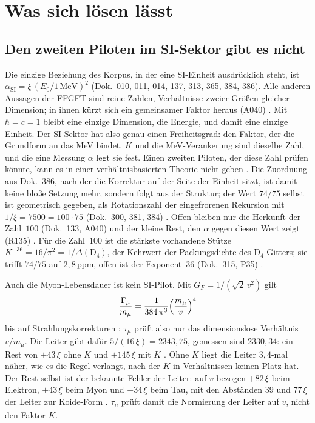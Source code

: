 \section{Was sich lösen lässt}

\subsection{Den zweiten Piloten im SI-Sektor gibt es nicht}

Die einzige Beziehung des Korpus, in der eine SI-Einheit ausdrücklich steht, ist
$\alpha_{\text{SI}}=\xi\,(E_0/1\,\text{MeV})^2$ (Dok.~010, 011, 014, 137, 313, 365, 384, 386). Alle anderen
Aussagen der FFGFT sind reine Zahlen, Verhältnisse zweier Größen gleicher Dimension; in ihnen kürzt sich
ein gemeinsamer Faktor heraus (A040) \BM. Mit $\hbar=c=1$ bleibt eine einzige Dimension, die Energie, und
damit eine einzige Einheit. Der SI-Sektor hat also genau einen Freiheitsgrad: den Faktor, der die Grundform
an das MeV bindet. $K$ und die MeV-Verankerung sind dieselbe Zahl, und die eine Messung $\alpha$ legt sie
fest. Einen zweiten Piloten, der diese Zahl prüfen könnte, kann es in einer verhältnisbasierten Theorie
nicht geben \BM. Die Zuordnung aus Dok.~386, nach der die Korrektur auf der Seite der Einheit sitzt, ist
damit keine bloße Setzung mehr, sondern folgt aus der Struktur; der Wert $74/75$ selbst ist
geometrisch gegeben, als Rotationszahl der eingefrorenen Rekursion mit $1/\xi=7500=100\cdot75$
(Dok.~300, 381, 384) \BM. Offen bleiben nur die Herkunft der Zahl~$100$ (Dok.~133, A040) und der
kleine Rest, den $\alpha$ gegen diesen Wert zeigt (R135) \SM. Für die Zahl~$100$ ist die stärkste
vorhandene Stütze $K^{-36}=16/\pi^2=1/\Delta(\mathrm{D}_4)$, der Kehrwert der Packungsdichte des
$\mathrm{D}_4$-Gitters; sie trifft $74/75$ auf $2{,}8$\,ppm, offen ist der Exponent~$36$ (Dok.~315, P35)
\KM.

Auch die Myon-Lebensdauer ist kein SI-Pilot. Mit $G_F=1/(\sqrt2\,v^2)$ gilt
\begin{equation}
  \frac{\Gamma_\mu}{m_\mu}=\frac{1}{384\,\pi^3}\Bigl(\frac{m_\mu}{v}\Bigr)^4
\end{equation}
bis auf Strahlungskorrekturen \QM; $\tau_\mu$ prüft also nur das dimensionslose Verhältnis $v/m_\mu$. Die
Leiter gibt dafür $5/(16\,\xi)=2343{,}75$, gemessen sind $2330{,}34$: ein Rest von $+43\,\xi$ ohne $K$
und $+145\,\xi$ mit $K$ \KM. Ohne $K$ liegt die Leiter $3{,}4$-mal näher, wie es die Regel verlangt, nach
der $K$ in Verhältnissen keinen Platz hat. Der Rest selbst ist der bekannte Fehler der Leiter: auf $v$
bezogen $+82\,\xi$ beim Elektron, $+43\,\xi$ beim Myon und $-34\,\xi$ beim Tau, mit den Abständen
$39$ und $77\,\xi$ der Leiter zur Koide-Form \KM. $\tau_\mu$ prüft damit die Normierung der Leiter auf
$v$, nicht den Faktor $K$.

